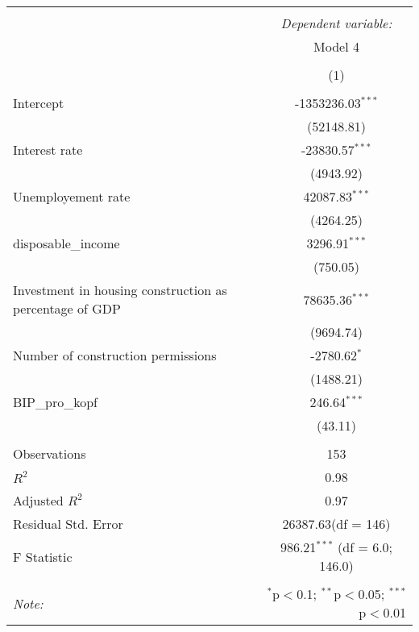 \begin{table}[!htbp] \centering
\begin{tabular}{@{\extracolsep{5pt}}lc}
\\[-1.8ex]\hline
\hline \\[-1.8ex]
& \multicolumn{1}{c}{\textit{Dependent variable:}} \
\cr \cline{1-2}
\\[-1.8ex] & \multicolumn{1}{c}{Model 4} \\\\[-1.8ex] & (1) \\
\hline \\[-1.8ex]
 Intercept & -1353236.03$^{***}$ \\
  & (52148.81) \\
 Interest rate & -23830.57$^{***}$ \\
  & (4943.92) \\
 Unemployement rate & 42087.83$^{***}$ \\
  & (4264.25) \\
 disposable_income & 3296.91$^{***}$ \\
  & (750.05) \\
 Investment in housing construction as percentage of GDP & 78635.36$^{***}$ \\
  & (9694.74) \\
 Number of construction permissions & -2780.62$^{*}$ \\
  & (1488.21) \\
 BIP_pro_kopf & 246.64$^{***}$ \\
  & (43.11) \\
\hline \\[-1.8ex]
 Observations & 153 \\
 $R^2$ & 0.98 \\
 Adjusted $R^2$ & 0.97 \\
 Residual Std. Error & 26387.63(df = 146)  \\
 F Statistic & 986.21$^{***}$ (df = 6.0; 146.0) \\
\hline
\hline \\[-1.8ex]
\textit{Note:} & \multicolumn{1}{r}{$^{*}$p$<$0.1; $^{**}$p$<$0.05; $^{***}$p$<$0.01} \\
\end{tabular}
\end{table}